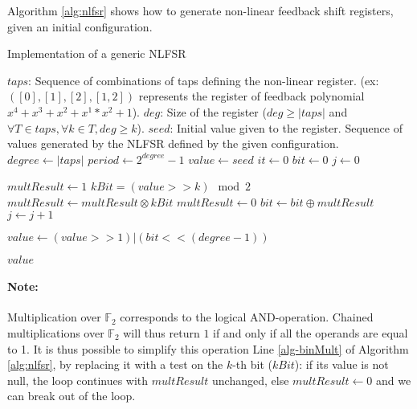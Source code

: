 \documentclass{llncs}
\begin{document}
Algorithm \ref{alg:nlfsr} shows how to generate non-linear feedback shift registers, given an initial configuration.

\begin{algorithm}[ht]
  \caption{Implementation of a generic NLFSR}\label{alg:nlfsr}
  \begin{algorithmic}[1]
    \Require
      \Statex $taps$: Sequence of combinations of taps defining the non-linear register. (ex: $([0],[1],[2],[1,2])$ represents the register of feedback polynomial $x^4 + x^3 + x^2  + x^1*x^2 + 1$).
      \Statex $deg$: Size of the register ($deg \geq |taps|$ and $\forall T \in taps, \forall k \in T, deg \geq k$).
      \Statex $seed$: Initial value given to the register.
    \Ensure
      \Statex Sequence of values generated by the NLFSR defined by the given configuration.
    \Statex
    \State $degree \gets |taps|$ 
    \State $period \gets 2^{degree} - 1$ 
    \State $value \gets seed$ 
    \State $it \gets 0$
        \State $bit \gets 0$ 
        \State $j \gets 0$
            
        		\State $multResult \gets 1$
                	\State $kBit = (value >> k) \mod 2$ 
                	\State $multResult \gets multResult \otimes kBit$ \label{alg-binMult}
                \EndFor
            \Else
            	\State $multResult \gets 0$
            \EndIf
            \State $bit \gets bit \oplus multResult$ 
            \State $j \gets j+1$
    	\EndFor
        
        \State $value \gets (value >> 1) | (bit << (degree-1))$
        
        \Return $value$ 
    \EndWhile
  \end{algorithmic}
\end{algorithm}

\paragraph{Note:} Multiplication over $\mathbb{F}_2$ corresponds to the logical AND-operation. Chained multiplications over  $\mathbb{F}_2$ will thus return $1$ if and only if all the operands are equal to 1. It is thus possible to simplify this operation Line \ref{alg-binMult} of Algorithm \ref{alg:nlfsr}, by replacing it with a test on the $k$-th bit ($kBit$): if its value is not null, the loop continues with $multResult$ unchanged, else $multResult \gets 0$ and we can break out of the loop.
\end{document}
